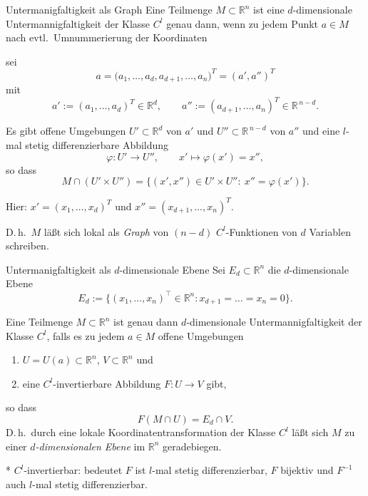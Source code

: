 \begin{satz}{Untermanigfaltigkeit als Graph}
    Eine Teilmenge $M\subset\mathbb{R}^n$ ist eine $d$-dimensionale Untermannigfaltigkeit der Klasse $C^l$ genau dann, wenn zu jedem Punkt $a\in M$ nach evtl.\ Umnummerierung der Koordinaten

    sei
    $$
    a=\bigl(a_1,\dots,a_d,a_{d+1},\dots,a_n\bigr)^T=(a',a'')^T
    $$
    mit
    $$
    a':=(a_1,\dots,a_d)^T\in\mathbb{R}^d,\qquad
    a'':=(a_{d+1},\dots,a_n)^T\in\mathbb{R}^{\,n-d}.
    $$

    Es gibt offene Umgebungen $U'\subset\mathbb{R}^d$ von $a'$ und $U''\subset\mathbb{R}^{\,n-d}$ von $a''$ und eine $l$-mal stetig differenzierbare Abbildung
    $$
    \varphi:U'\to U'',\qquad x'\mapsto \varphi(x')=x'',
    $$
    so dass
    $$
    M\cap (U'\times U'')=\{(x',x'')\in U'\times U'':\ x''=\varphi(x')\}.
    $$

    Hier: $x'=(x_1,\dots,x_d)^T$ und $x''=(x_{d+1},\dots,x_n)^T$.
    \vspace{1em}

    D.\,h.\ $M$ läßt sich lokal als \emph{Graph} von $(n-d)$ $C^l$-Funktionen von $d$ Variablen schreiben.    
\end{satz}

\begin{satz}{Untermanigfaltigkeit als $d$-dimensionale Ebene}
    Sei $E_d\subset\mathbb{R}^n$ die $d$-dimensionale Ebene
    $$
        E_d := \{(x_1,\dots,x_n)^\top\in\mathbb{R}^n : x_{d+1}=\dots = x_n = 0\}.
    $$

    Eine Teilmenge $M\subset\mathbb{R}^n$ ist genau dann $d$-dimensionale Untermannigfaltigkeit der Klasse $C^l$, falls es zu jedem $a\in M$ offene Umgebungen
    \begin{enumerate}
        \item $U=U(a)\subset\mathbb{R}^n$, $V\subset\mathbb{R}^n$ und
        \item eine $C^l$-invertierbare Abbildung $F:U\to V$ gibt,
        
    \end{enumerate}
     so dass
    $$
        F(M\cap U) = E_d\cap V.
    $$
    D.\,h.\ durch eine lokale Koordinatentransformation der Klasse $C^l$ läßt sich $M$ zu einer \emph{$d$-dimensionalen Ebene} im $\mathbb{R}^n$ geradebiegen.

    \bigskip

    \footnotesize{* $C^l$-invertierbar: bedeutet $F$ ist $l$-mal stetig differenzierbar, $F$ bijektiv und $F^{-1}$ auch $l$-mal stetig differenzierbar.}    
\end{satz}

